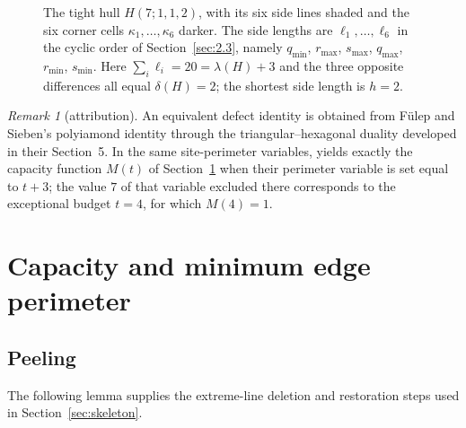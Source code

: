 \documentclass[11pt]{article}
\theoremstyle{plain}
\theoremstyle{definition}
\theoremstyle{remark}
\newtheorem{remark}[theorem]{Remark}
\begin{document}
\begin{figure}[H]
\caption{The tight hull \(H(7;1,1,2)\), with its six side lines shaded and the six corner
cells \(\kappa_{1},\dots,\kappa_{6}\) darker. The side lengths are
\(\ell_{1},\dots,\ell_{6}\) in the cyclic order of Section~\ref{sec:2.3}, namely
\(q_{\min}\), \(r_{\max}\), \(s_{\max}\), \(q_{\max}\), \(r_{\min}\), \(s_{\min}\). Here
\(\sum_{i}\ell_{i}=20=\lambda(H)+3\) and the three opposite differences all equal
\(\delta(H)=2\); the shortest side length is \(h=2\).}\label{fig:hull}
\end{figure}

\begin{remark}[attribution]\label{rem:fs}
An equivalent defect identity is obtained from F\"ulep and Sieben's polyiamond identity
\cite[Lemma~3.3]{FulepSieben2010} through the triangular--hexagonal duality developed in their Section~5.
In the same site-perimeter variables, \cite[Proposition~5.10]{FulepSieben2010} yields exactly the capacity
function $M(t)$ of Section~\ref{sec:capacity} when their perimeter variable is set equal to $t+3$; the value $7$
of that variable excluded there corresponds to the exceptional budget $t=4$, for which $M(4)=1$.
\end{remark}


\section{Capacity and minimum edge perimeter}\label{sec:capacity}

\subsection{Peeling}\label{sec:2.6}

The following lemma supplies the extreme-line deletion and restoration steps
used in Section~\ref{sec:skeleton}.
\end{document}
